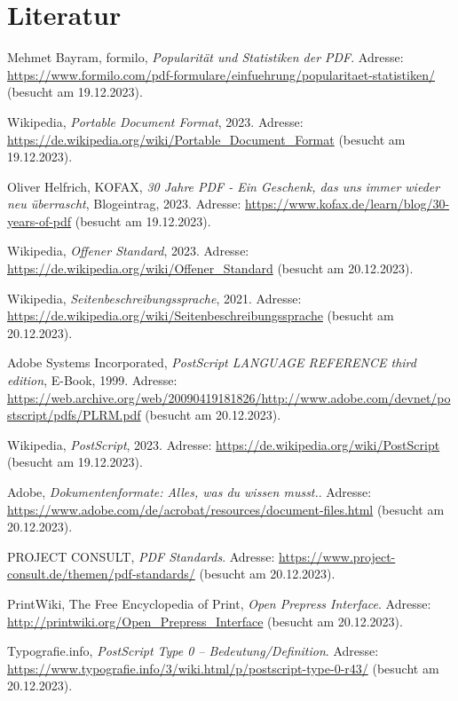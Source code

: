 \chapter*{Literatur}
%
\begin{referenceslist}
	\item Mehmet Bayram, formilo, \emph{Popularität und Statistiken der PDF}. Adresse: \url{https://www.formilo.com/pdf-formulare/einfuehrung/popularitaet-statistiken/} (besucht am 19.12.2023).
	
	\itema Wikipedia, \emph{Portable Document Format}, 2023. Adresse: \url{https://de.wikipedia.org/wiki/Portable_Document_Format} (besucht am 19.12.2023).
	
	\itemb Oliver Helfrich, KOFAX, \emph{30 Jahre PDF - Ein Geschenk, das uns immer wieder neu überrascht}, Blogeintrag, 2023. Adresse: \url{https://www.kofax.de/learn/blog/30-years-of-pdf} (besucht am 19.12.2023).
	
	\itemc Wikipedia, \emph{Offener Standard}, 2023. Adresse: \url{https://de.wikipedia.org/wiki/Offener_Standard} (besucht am 20.12.2023).
	
	\itemd Wikipedia, \emph{Seitenbeschreibungssprache}, 2021. Adresse: \url{https://de.wikipedia.org/wiki/Seitenbeschreibungssprache} (besucht am 20.12.2023). 
	
	\iteme Adobe Systems Incorporated, \emph{PostScript LANGUAGE REFERENCE third edition}, E-Book, 1999. Adresse: \url{https://web.archive.org/web/20090419181826/http://www.adobe.com/devnet/postscript/pdfs/PLRM.pdf} (besucht am 20.12.2023).
	
	\itemf Wikipedia, \emph{PostScript}, 2023. Adresse: \url{https://de.wikipedia.org/wiki/PostScript} (besucht am 19.12.2023).
	
	\itemg Adobe, \emph{Dokumentenformate: Alles, was du wissen musst.}. Adresse: \url{https://www.adobe.com/de/acrobat/resources/document-files.html} (besucht am 20.12.2023).
	
	\itemh PROJECT CONSULT, \emph{PDF Standards}. Adresse: \url{https://www.project-consult.de/themen/pdf-standards/} (besucht am 20.12.2023).
	
	\itemi PrintWiki, The Free Encyclopedia of Print, \emph{Open Prepress Interface}. Adresse: \url{http://printwiki.org/Open_Prepress_Interface} (besucht am 20.12.2023).
	
	\itemj Typografie.info, \emph{PostScript Type 0 – Bedeutung/Definition}. Adresse: \url{https://www.typografie.info/3/wiki.html/p/postscript-type-0-r43/} (besucht am 20.12.2023).
	

\end{referenceslist}
